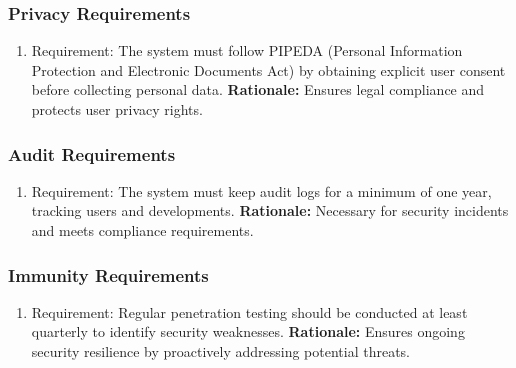 \documentclass[]{article}
\begin{document}
\subsubsection{Privacy Requirements} \label{ssub:privacy_requirements} %
\begin{enumerate}[{SR-P}1. ] \item Requirement: The system must follow PIPEDA (Personal Information Protection and Electronic Documents Act) by obtaining explicit user consent before collecting personal data. \newline \textbf{Rationale:} Ensures legal compliance and protects user privacy rights. \end{enumerate} %
\subsubsection{Audit Requirements} \label{ssub:audit_requirements} %
\begin{enumerate}[{SR-AU}1. ] \item Requirement: The system must keep audit logs for a minimum of one year, tracking users and developments. \newline \textbf{Rationale:} Necessary for security incidents and meets compliance requirements. \end{enumerate} %
\subsubsection{Immunity Requirements} \label{ssub:immunity_requirements} %
 \begin{enumerate}[{SR-IM}1. ] \item Requirement: Regular penetration testing should be conducted at least quarterly to identify security weaknesses. \newline \textbf{Rationale:} Ensures ongoing security resilience by proactively addressing potential threats. \end{enumerate} %




\end{document}
